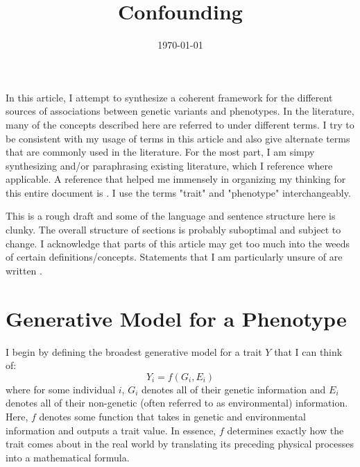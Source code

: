\documentclass[12pt]{article}
\title{Confounding}
\date{\today}
\begin{document}
\maketitle

In this article, I attempt to synthesize a coherent framework for the different sources of associations between genetic variants and phenotypes.
In the literature, many of the concepts described here are referred to under different terms.
I try to be consistent with my usage of terms in this article and also give alternate terms that are commonly used in the literature.
For the most part, I am simpy synthesizing and/or paraphrasing existing literature, which I reference where applicable.
A reference that helped me immensely in organizing my thinking for this entire document is \citep{Veller2024PLoS}.
I use the terms "trait" and "phenotype" interchangeably.

This is a rough draft and some of the language and sentence structure here is clunky.
The overall structure of sections is probably suboptimal and subject to change. 
I acknowledge that parts of this article may get too much into the weeds of certain definitions/concepts.
Statements that I am particularly unsure of are written .

\section{Generative Model for a Phenotype}
I begin by defining the broadest generative model for a trait $Y$ that I can think of:
$$ Y_i = f(G_i,E_i)$$
where for some individual $i$, $G_i$ denotes all of their genetic information and $E_i$ denotes all of their non-genetic (often referred to as environmental) information.
Here, $f$ denotes some function that takes in genetic and environmental information and outputs a trait value.
In essence, $f$ determines exactly how the trait comes about in the real world by translating its preceding physical processes into a mathematical formula.
\end{document}
